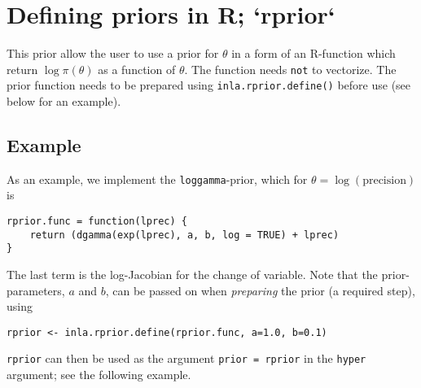 \documentclass[a4paper,11pt]{article}
\begin{document}
\section*{Defining priors in R; `rprior`}

This prior allow the user to use a prior for $\theta$ in a form of an
R-function which return $\log\pi(\theta)$ as a function of $\theta$.
The function needs \texttt{not} to vectorize. The prior function needs
to be prepared using \texttt{inla.rprior.define()} before use (see below
for an example).

\subsection*{Example}

As an example, we implement the \texttt{loggamma}-prior, which for
$\theta = \log(\text{precision})$ is
\begin{verbatim}
rprior.func = function(lprec) {
    return (dgamma(exp(lprec), a, b, log = TRUE) + lprec)
}
\end{verbatim}
The last term is the log-Jacobian for the change of variable. Note
that the prior-parameters, $a$ and $b$, can be passed on when
\emph{preparing} the prior (a required step), using
\begin{verbatim}
rprior <- inla.rprior.define(rprior.func, a=1.0, b=0.1)
\end{verbatim}
\texttt{rprior} can then be used as the argument \texttt{prior =
    rprior} in the \texttt{hyper} argument; see the following example.


\end{document}
